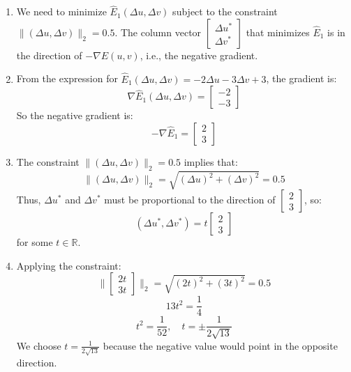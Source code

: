 \begin{example}
    \begin{enumerate}
        \item We need to minimize \( \hat{E}_1(\Delta u, \Delta v) \) subject to the constraint \( \|\left(\Delta u, \Delta v\right)\|_2 = 0.5 \). The column vector \( \begin{bmatrix} \Delta u^* \\ \Delta v^* \end{bmatrix} \) that minimizes \( \hat{E}_1 \) is in the direction of \( -\nabla E(u, v) \), i.e., the negative gradient.
        
        \item From the expression for \( \hat{E}_1(\Delta u, \Delta v) = -2 \Delta u - 3 \Delta v + 3 \), the gradient is:
        \[
        \nabla \hat{E}_1(\Delta u, \Delta v) = \begin{bmatrix} -2 \\ -3 \end{bmatrix}
        \]
        So the negative gradient is:
        \[
        -\nabla \hat{E}_1 = \begin{bmatrix} 2 \\ 3 \end{bmatrix}
        \]
    
        \item The constraint \( \|\left(\Delta u, \Delta v\right)\|_2 = 0.5 \) implies that:
        \[
        \|\left(\Delta u, \Delta v\right)\|_2 = \sqrt{(\Delta u)^2 + (\Delta v)^2} = 0.5
        \]
        Thus, \( \Delta u^* \) and \( \Delta v^* \) must be proportional to the direction of \( \begin{bmatrix} 2 \\ 3 \end{bmatrix} \), so:
        \[
        \left(\Delta u^*, \Delta v^*\right) = t \begin{bmatrix} 2 \\ 3 \end{bmatrix}
        \]
        for some \( t \in \mathbb{R} \).
    
        \item Applying the constraint:
        \[
        \| \begin{bmatrix} 2t \\ 3t \end{bmatrix} \|_2 = \sqrt{(2t)^2 + (3t)^2} = 0.5
        \]
        \[
        13t^2 = \frac{1}{4}
        \]
        \[
        t^2 = \frac{1}{52}, \quad t = \pm \frac{1}{2\sqrt{13}}
        \]
        We choose \( t = \frac{1}{2\sqrt{13}} \) because the negative value would point in the opposite direction.
    

\end{enumerate}
\end{example}
